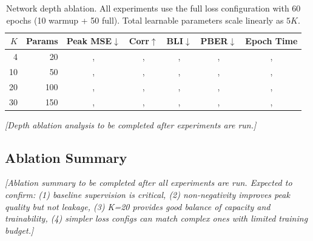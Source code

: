 \begin{table}[t]
    \centering
    \caption{Network depth ablation. All experiments use the full loss configuration with 60 epochs (10 warmup + 50 full). Total learnable parameters scale linearly as $5K$.}
    \label{tab:ablation_depth}
    \begin{tabular}{@{}rrccccc@{}}
        \toprule
        $K$ & \textbf{Params} & \textbf{Peak MSE}$\downarrow$ & \textbf{Corr}$\uparrow$ & \textbf{BLI}$\downarrow$ & \textbf{PBER}$\downarrow$ & \textbf{Epoch Time} \\
        \midrule
        4  & 20  & ,  & ,  & ,  & ,  & ,  \\
        10 & 50  & ,  & ,  & ,  & ,  & ,  \\
        20 & 100 & ,  & ,  & ,  & ,  & ,  \\
        30 & 150 & ,  & ,  & ,  & ,  & ,  \\
        \bottomrule
    \end{tabular}
\end{table}


\textit{[Depth ablation analysis to be completed after experiments are run.]}



\subsection{Ablation Summary}
\label{sec:results_ablation_summary}

\textit{[Ablation summary to be completed after all experiments are run. Expected to confirm: (1) baseline supervision is critical, (2) non-negativity improves peak quality but not leakage, (3) K=20 provides good balance of capacity and trainability, (4) simpler loss configs can match complex ones with limited training budget.]}



